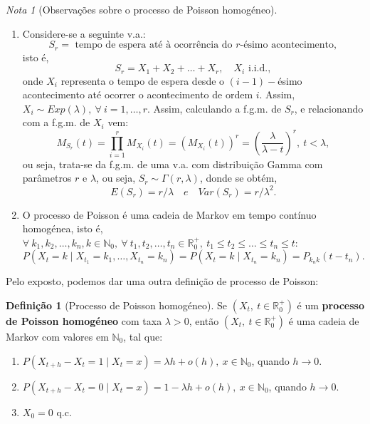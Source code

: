 \documentclass[
  11pt,
  a4paper,
]{book}
\theoremstyle{definition}
\newtheorem{definition}{Definição}[chapter]
\theoremstyle{definition}
\theoremstyle{definition}
\theoremstyle{definition}
\theoremstyle{remark}
\newtheorem*{remark}{Nota }
\begin{document}
\begin{remark}[Observações sobre o processo de Poisson homogéneo]
\begin{enumerate}
\def\labelenumi{\arabic{enumi}.}
\setcounter{enumi}{2}
\item
  Considere-se a seguinte v.a.:
  \[S_r=\text{ tempo de espera até à ocorrência do } r\text{-ésimo acontecimento},\]
  isto é,
  \[S_r=X_1+X_2+\dots+X_r, \quad X_i \text{ i.i.d.},\]
  onde \(X_i\) representa o tempo de espera desde o \((i-1)-\)ésimo acontecimento até ocorrer o acontecimento de ordem \(i\). Assim,
  \(X_i \sim Exp(\lambda), ~\forall ~i =1, \dots,r.\) Assim, calculando a f.g.m. de \(S_r\), e relacionando com a f.g.m. de \(X_i\) vem:
  \[
  M_{S_r}(t)=\prod\limits_{i=1}^{r}M_{X_i}(t)=(M_{X_i}(t))^r=\left(\dfrac{\lambda}{\lambda-t}\right)^r, ~t< \lambda,
  \]
  ou seja, trata-se da f.g.m. de uma v.a. com distribuição Gamma com parâmetros \(r\) e \(\lambda\), ou seja, \(S_r \sim \Gamma(r,\lambda)\), donde se obtém,
  \[E(S_r)=r/\lambda \quad { e } \quad Var(S_r)=r/\lambda^2.\]
\item
  O processo de Poisson é uma cadeia de Markov em tempo contínuo homogénea, isto é, \(\forall ~k_1,k_2,\dots,k_n,k \in \mathbb{N}_0, ~\forall ~t_1,t_2,\dots,t_n \in \mathbb{R}_0^+, ~t_1 \leq t_2 \leq \dots \leq t_n \leq t\):
  \[P(X_{t}=k \mid X_{t_1}=k_1, \dots,X_{t_n}=k_n)=P(X_t=k \mid X_{t_n}=k_n)=P_{k_nk}(t-t_n).\]
\end{enumerate}

\end{remark}

Pelo exposto, podemos dar uma outra definição de processo de Poisson:

\begin{definition}[Processo de Poisson homogéneo]

Se \((X_t, ~ t \in \mathbb{R}_0^+)\) é um \textbf{processo de Poisson homogéneo} com taxa \(\lambda >0\), então \((X_t, ~ t \in \mathbb{R}_0^+)\) é uma cadeia de Markov com valores em \(\mathbb{N}_0\), tal que:

\begin{enumerate}
\def\labelenumi{(\roman{enumi})}
\item
  \(P(X_{t+h}-X_t=1 \mid X_{t}=x)=\lambda h + o(h), ~x \in \mathbb{N}_0\), quando \(h \to 0\).
\item
  \(P(X_{t+h}-X_t=0 \mid X_{t}=x)=1-\lambda h + o(h), ~x \in \mathbb{N}_0\), quando \(h \to 0\).
\item
  \(X_0=0\) q.c.
\end{enumerate}

\end{definition}
\end{document}
